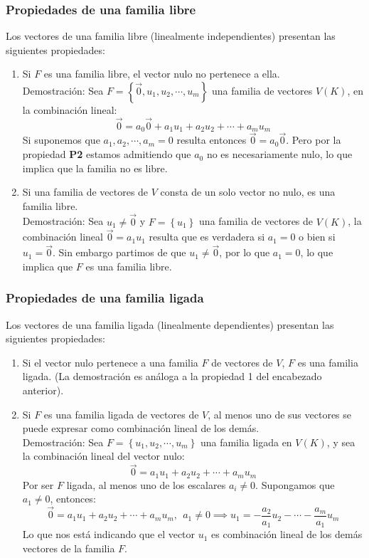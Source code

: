 \subsubsection{Propiedades de una familia libre}

Los vectores de una familia libre (linealmente independientes) presentan las siguientes propiedades:
\begin{enumerate}
  \item Si \(F\) es una familia libre, el vector nulo no pertenece a ella. \\ Demostración: Sea \(F=\left\{\vec{0},u_1, u_2, \cdots, u_m\right\}\) una familia de vectores \(V(K)\), en la combinación lineal: \[
    \vec{0} = a_0 \vec{0} + a_1 u_1 + a_2 u_2 + \cdots + a_m u_m
  \]
  Si suponemos que \(a_1, a_2, \cdots, a_m = 0\) resulta entonces \(\vec{0}=a_0 \vec{0}\). Pero por la propiedad \textbf{P2} estamos admitiendo que \(a_0\) no es necesariamente nulo, lo que implica que la familia no es libre.
  \item Si una familia de vectores de \(V\) consta de un solo vector no nulo, es una familia libre. \\ Demostración: Sea \(u_1 \neq \vec{0}\) y \(F=\left\{u_1\right\}\) una familia de vectores de \(V(K)\), la combinación lineal \(\vec{0} = a_1 u_1\) resulta que es verdadera si \(a_1 = 0\) o bien si \(u_1 = \vec{0}\). Sin embargo partimos de que \(u_1 \neq \vec{0}\), por lo que \(a_1 = 0\), lo que implica que \(F\) es una familia libre.
\end{enumerate}

\subsubsection{Propiedades de una familia ligada}

Los vectores de una familia ligada (linealmente dependientes) presentan las siguientes propiedades:
\begin{enumerate}
  \item Si el vector nulo pertenece a una familia \(F\) de vectores de \(V\), \(F\) es una familia ligada. (La demostración es análoga a la propiedad 1 del encabezado anterior).
  \item Si \(F\) es una familia ligada de vectores de \(V\), al menos uno de sus vectores se puede expresar como combinación lineal de los demás. \\ Demostración: Sea \(F=\left\{u_1, u_2, \cdots, u_m\right\}\) una familia ligada en \(V(K)\), y sea la combinación lineal del vector nulo:\[
    \vec{0} = a_1 u_1 + a_2 u_2 + \cdots + a_m u_m
  \]
  Por ser \(F\) ligada, al menos uno de los escalares \(a_i \neq 0\). Supongamos que \(a_1 \neq 0\), entonces: \[
    \vec{0} = a_1 u_1 + a_2 u_2 + \cdots + a_m u_m, ~~ a_1 \neq 0 \implies u_1 = -\frac{a_2}{a_1}u_2 - \cdots - \frac{a_m}{a_1}u_m
  \]
  Lo que nos está indicando que el vector \(u_1\) es combinación lineal de los demás vectores de la familia \(F\).
\end{enumerate}

